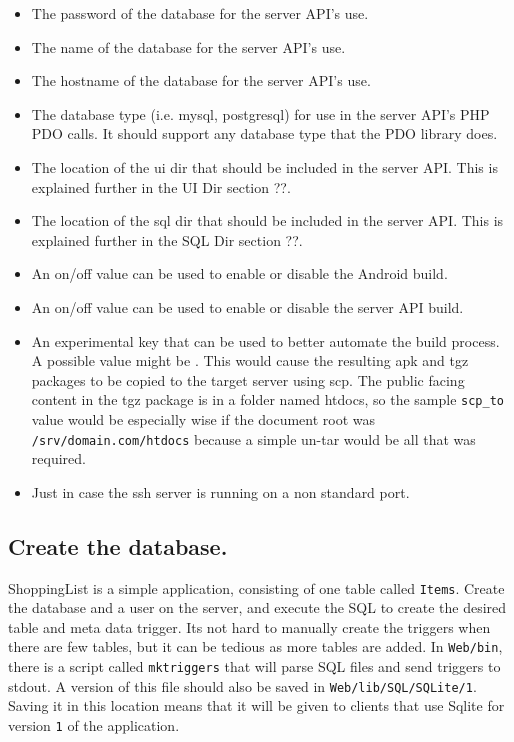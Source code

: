 \begin{itemize}
\item {} The password of the database for the server API's use.
\item {} The name of the database for the server API's use.
\item {} The hostname of the database for the server API's use.
\item {} The database type (i.e. mysql, postgresql) for use in the server API's PHP PDO calls. It should support any database type that the PDO library does.
\item {} The location of the ui dir that should be included in the server API. This is explained further in the UI Dir section ??.
\item {} The location of the sql dir that should be included in the server API. This is explained further in the SQL Dir section ??.
\item {} An on/off value can be used to enable or disable the Android build.
\item {} An on/off value can be used to enable or disable the server API build.
\item {} An experimental key that can be used to better automate the build process. A possible value might be . This would cause the resulting apk and tgz packages to be copied to the target server using scp. The public facing content in the tgz package is in a folder named htdocs, so the sample \texttt{scp\_to} value would be especially wise if the document root was \texttt{/srv/domain.com/htdocs} because a simple un-tar would be all that was required. 
\item {} Just in case the ssh server is running on a non standard port.
\end{itemize}





\subsection{Create the database.}  \label{sec:}

ShoppingList is a simple application, consisting of one table called
\texttt{Items}. Create the database and a user on the server, and execute the
SQL to create the desired table and meta data trigger. Its not hard to manually
create the triggers when there are few tables, but it can be tedious as more
tables are added. In \texttt{Web/bin}, there is a script called
\texttt{mktriggers} that will parse SQL files and send triggers to stdout. A
version of this file should also be saved in \texttt{Web/lib/SQL/SQLite/1}.
Saving it in this location means that it will be given to clients that use
Sqlite for version \texttt{1} of the application.



